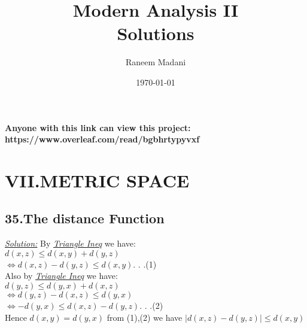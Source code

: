\documentclass{book}
\title{\Huge Modern Analysis II\\Solutions}
\author{\huge Raneem Madani }
\date{\today}
\begin{document}
\maketitle

\begin{tcolorbox}[colback=black!5!white,colframe=black!10!black]
\begin{center}
\textbf{\Large{Anyone with this link can view this project:\\
https://www.overleaf.com/read/bgbhrtypyvxf}}
\end{center}
\end{tcolorbox}
\tableofcontents


\chapter{ VII.METRIC SPACE}
\section{35.The distance Function}


\begin{tcolorbox}[enhanced,attach boxed title to top center={yshift=-3mm,yshifttext=-1mm},
colback=blue!5!white,colframe=blue!75!black,colbacktitle=red!80!black,
title=Exercise 35.3:,fonttitle=\bfseries,
boxed title style={size=small,colframe=red!50!black} ]
\textit{\color{blue}\underline{Solution:}}
By \textit{\underline{Triangle Ineq}} we have:\\
$d(x,z)\leq d(x,y)+d(y,z)$\\
$\Leftrightarrow d(x,z)-d(y,z) \leq d(x,y) $. . .(1)\\
Also by \textit{\underline{Triangle Ineq}} we have:\\
$d(y,z)\leq d(y,x)+d(x,z)$\\
$\Leftrightarrow d(y,z)-d(x,z)\leq d(y,x) $\\
$\Leftrightarrow -d(y,x)\leq d(x,z)-d(y,z)$. . .(2)\\
Hence $d(x,y)=d(y,x)$ from (1),(2) we have $|d(x,z)-d(y,z)|\leq d(x,y)$
\end{tcolorbox}
\end{document}
